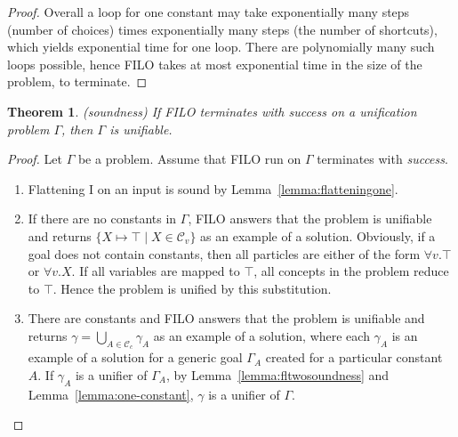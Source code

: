 \documentclass{article}
\newtheorem{theorem}{Theorem}
\begin{document}
\begin{proof}
		Overall a loop for one constant may take exponentially many steps (number of choices) times exponentially many steps (the number of shortcuts),
		which yields exponential time for one loop. There are polynomially many such loops possible, hence FILO takes at most exponential time in the size of the problem, to terminate.
		
	\end{proof}
	\begin{theorem}(soundness)
	If FILO terminates with \emph{success} on a unification problem $\Gamma$, then $\Gamma$ is unifiable.
	\end{theorem}
	
		\begin{proof}
		Let $\Gamma$ be a problem. Assume that FILO run on $\Gamma$ terminates with \emph{success}.
		\begin{enumerate}
		\item Flattening I on an input is sound by Lemma~\ref{lemma:flatteningone}.
		
		\item  If there are no constants in $\Gamma$, FILO answers that the problem is unifiable and returns $\{ X \mapsto \top \mid X \in \mathcal{C}_v \}$ as an example of a solution.
		Obviously, if a goal does not contain constants, then all particles are either of the form $\forall v.\top$ or $\forall v.X$. If all
		variables are mapped to $\top$, all concepts in the problem reduce to $\top$. Hence the problem is unified by this substitution.
		
		\item  There are constants and FILO answers that the problem is unifiable and returns $\gamma = \bigcup_{A \in \mathcal{C}_c} \gamma_A$ as an example of a solution, where each $\gamma_A$ is an example of a solution for a generic goal $\Gamma_A$ created for a particular constant $A$. 
		If $\gamma_A$ is a unifier of $\Gamma_A$, by Lemma~\ref{lemma:fltwosoundness} and Lemma~\ref{lemma:one-constant}, $\gamma$ is a unifier of $\Gamma$.
		

\end{enumerate}
\end{proof}
\end{document}
